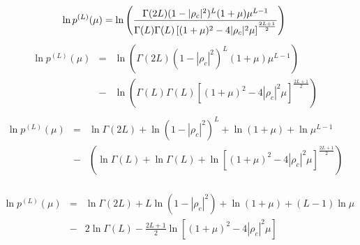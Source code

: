 \begin{equation}\label{eqn64}
	\ln p^{(L)}(\mu)=\ln\left(\frac{\Gamma(2L)(1-|\rho_c|^2)^{L}(1+\mu)\mu^{L-1}}{\Gamma(L)\Gamma(L)\left[(1+\mu)^2-4|\rho_c|^2\mu \right]^{\frac{2L+1}{2}}}\right)\\
\end{equation}
\begin{equation}\label{eqn64}
\begin{array}{ccc}
	\ln p^{(L)}(\mu)&=&\ln\left(\Gamma(2L)(1-|\rho_c|^2)^{L}(1+\mu)\mu^{L-1}\right)\\
	&-&\ln\left(\Gamma(L)\Gamma(L)\left[(1+\mu)^2-4|\rho_c|^2\mu \right]^{\frac{2L+1}{2}}\right)\\
\end{array}
\end{equation}
\begin{equation}\label{eqn64}
\begin{array}{ccc}
	\ln p^{(L)}(\mu)&=&\ln\Gamma(2L) +\ln(1-|\rho_c|^2)^{L}+\ln(1+\mu)+\ln\mu^{L-1}\\
	&-&\left(\ln\Gamma(L)+\ln\Gamma(L)+\ln\left[(1+\mu)^2-4|\rho_c|^2\mu \right]^{\frac{2L+1}{2}}\right)\\
\end{array}
\end{equation}

\begin{equation}\label{eqn64}
\begin{array}{ccl}
	\ln p^{(L)}(\mu)&=&\ln\Gamma(2L) +L\ln(1-|\rho_c|^2)+\ln(1+\mu)+(L-1)\ln\mu\\
	&-&2\ln\Gamma(L)-\frac{2L+1}{2}\ln\left[(1+\mu)^2-4|\rho_c|^2\mu \right]\\
\end{array}
\end{equation}

